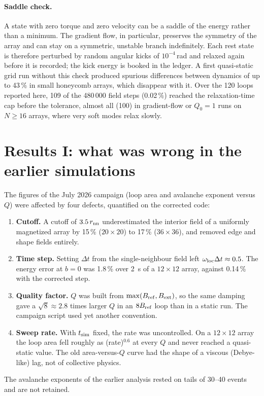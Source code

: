 \documentclass[11pt,a4paper]{article}
\begin{document}
\paragraph{Saddle check.} A state with zero torque and zero velocity can be a saddle of the energy rather than a minimum. The gradient flow, in particular, preserves the symmetry of the array and can stay on a symmetric, unstable branch indefinitely. Each rest state is therefore perturbed by random angular kicks of $10^{-4}$\,rad and relaxed again before it is recorded; the kick energy is booked in the ledger. A first quasi-static grid run without this check produced spurious differences between dynamics of up to 43\,\% in small honeycomb arrays, which disappear with it. Over the 120 loops reported here, 109 of the 480\,000 field steps (0.02\,\%) reached the relaxation-time cap before the tolerance, almost all (100) in gradient-flow or $Q_0=1$ runs on $N\ge16$ arrays, where very soft modes relax slowly.

\section{Results I: what was wrong in the earlier simulations}
\label{sec:res_audit}

The figures of the July 2026 campaign (loop area and avalanche exponent versus $Q$) were affected by four defects, quantified on the corrected code:
\begin{enumerate}[leftmargin=*]
\item \textbf{Cutoff.} A cutoff of $3.5\,r_{\rm nn}$ underestimated the interior field of a uniformly magnetized array by 15\,\% ($20\times20$) to 17\,\% ($36\times36$), and removed edge and shape fields entirely.
\item \textbf{Time step.} Setting $\Delta t$ from the single-neighbour field left $\omega_{\rm loc}\Delta t\approx0.5$. The energy error at $b=0$ was 1.8\,\% over \SI{2}{s} of a $12\times12$ array, against 0.14\,\% with the corrected step.
\item \textbf{Quality factor.} $Q$ was built from $\max(B_{\rm ref},B_{\rm ext})$, so the same damping gave a $\sqrt8\approx2.8$ times larger $Q$ in an $8B_{\rm ref}$ loop than in a static run. The campaign script used yet another convention.
\item \textbf{Sweep rate.} With $t_{\rm sim}$ fixed, the rate was uncontrolled. On a $12\times12$ array the loop area fell roughly as (rate)$^{0.6}$ at every $Q$ and never reached a quasi-static value. The old area-versus-$Q$ curve had the shape of a viscous (Debye-like) lag, not of collective physics.
\end{enumerate}
The avalanche exponents of the earlier analysis rested on tails of 30--40 events and are not retained.
\end{document}
